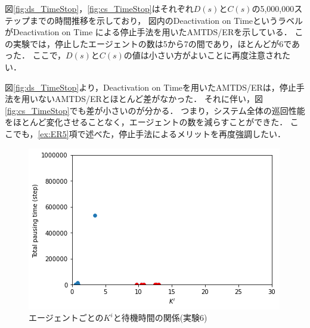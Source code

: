 \documentclass[12pt,a4j,twoside]{jarticle}
\begin{document}
  図\ref{fig:ds_TimeStop}，\ref{fig:cs_TimeStop}はそれぞれ$D(s)$と$C(s)$の5,000,000ステップまでの時間推移を示しており，
  図内のDeactivation on TimeというラベルがDeactivation on Time による停止手法を用いたAMTDS/ERを示している．
  この実験では，停止したエージェントの数は5から7の間であり，ほとんどが6であった．
  ここで，$D(s)$と$C(s)$の値は小さい方がよいことに再度注意されたい．
  \par

  図\ref{fig:ds_TimeStop}より，Deactivation on Timeを用いたAMTDS/ERは，停止手法を用いないAMTDS/ERとほとんど差がなかった．
  それに伴い，図\ref{fig:cs_TimeStop}でも差が小さいのが分かる．
  つまり，システム全体の巡回性能をほとんど変化させることなく，エージェントの数を減らすことができた．
  ここでも，\ref{ex:ER5}項で述べた，停止手法によるメリットを再度強調したい．


  \begin{figure}
    \centering
    \includegraphics[width=0.8\hsize]{figures/CorrectionScatter_Office_TimeStop.png}
    \caption{エージェントごとの$K^i$と待機時間の関係(実験6)}
    \label{fig:cscatter_TimeStop_Office}
  \end{figure}
\end{document}
